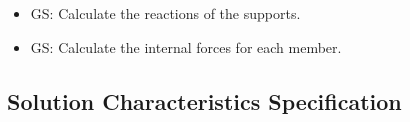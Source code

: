 \documentclass[12pt]{article}
\newcounter{goalnum} %
\begin{document}
\begin{itemize}

\item{GS\thegoalnum \label{G_support_reactions}: Calculate the reactions of the supports.}
\item{GS\thegoalnum \label{G_internal}: Calculate the internal forces for each member.}

\end{itemize}

\subsection{Solution Characteristics Specification}



\end{document}
